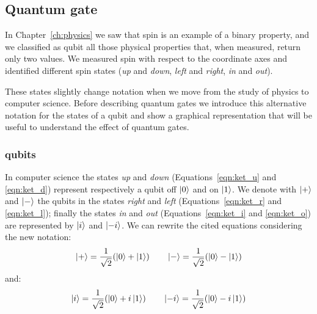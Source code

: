 \subsection{Quantum gate}
In Chapter~\ref{ch:physics} we saw that spin is an example of a binary property, and we classified as qubit all those physical properties that, when measured, return only two values. We measured spin with respect to the coordinate axes and identified different spin states (\emph{up} and \emph{down}, \emph{left} and \emph{right}, \emph{in} and \emph{out}). 

These states slightly change notation when we move from the study of physics to computer science. Before describing quantum gates we introduce this alternative notation for the states of a qubit and show a graphical representation that will be useful to understand the effect of quantum gates.
\subsubsection*{qubits}
In computer science the states \emph{up} and \emph{down} (Equations~\ref{eqn:ket_u} and \ref{eqn:ket_d}) represent respectively a qubit off $\Ket{0}$ and on $\Ket{1}$. We denote with $\Ket{+}$ and $\Ket{-}$ the qubits in the states \emph{right} and \emph{left} (Equations~\ref{eqn:ket_r} and \ref{eqn:ket_l}); finally the states \emph{in} and \emph{out} (Equations~\ref{eqn:ket_i} and \ref{eqn:ket_o}) are represented by $\Ket{i}$ and $\Ket{-i}$. We can rewrite the cited equations considering the new notation:
\begin{equation}
	\Ket{+}=\frac{1}{\sqrt{2}} (\Ket{0} + \Ket{1}) \qquad \Ket{-}=\frac{1}{\sqrt{2}} (\Ket{0} - \Ket{1})
\end{equation}
and:
\begin{equation}
	\Ket{i}=\frac{1}{\sqrt{2}} (\Ket{0} + i\Ket{1}) \qquad \Ket{-i}=\frac{1}{\sqrt{2}} (\Ket{0} - i\Ket{1})
\end{equation}

